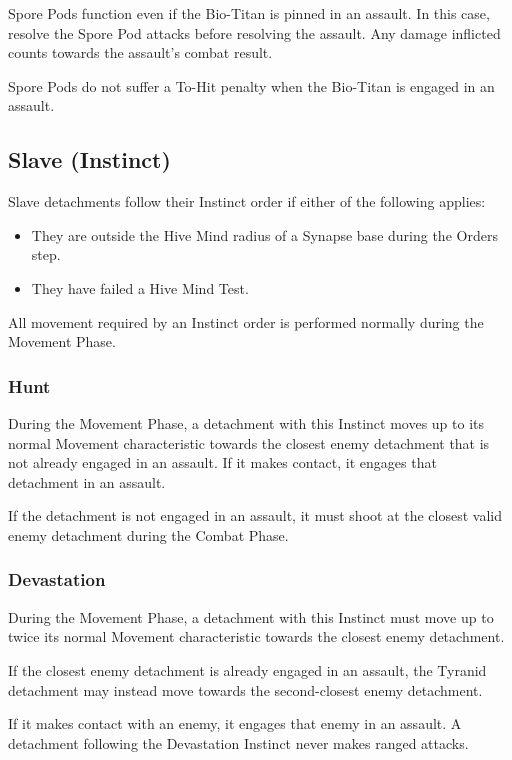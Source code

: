 Spore Pods function even if the Bio-Titan is pinned in an assault. In this case, resolve the Spore Pod attacks before resolving the assault. Any damage inflicted counts towards the assault's combat result.

Spore Pods do not suffer a To-Hit penalty when the Bio-Titan is engaged in an assault.

\subsection{Slave (Instinct)}

Slave detachments follow their Instinct order if either of the following applies:

\begin{itemize}
    \item They are outside the Hive Mind radius of a Synapse base during the Orders step.
    \item They have failed a Hive Mind Test.
\end{itemize}

All movement required by an Instinct order is performed normally during the Movement Phase.

\subsubsection{Hunt}

During the Movement Phase, a detachment with this Instinct moves up to its normal Movement characteristic towards the closest enemy detachment that is not already engaged in an assault. If it makes contact, it engages that detachment in an assault.

If the detachment is not engaged in an assault, it must shoot at the closest valid enemy detachment during the Combat Phase.

\subsubsection{Devastation}

During the Movement Phase, a detachment with this Instinct must move up to twice its normal Movement characteristic towards the closest enemy detachment.

If the closest enemy detachment is already engaged in an assault, the Tyranid detachment may instead move towards the second-closest enemy detachment.

If it makes contact with an enemy, it engages that enemy in an assault. A detachment following the Devastation Instinct never makes ranged attacks.

